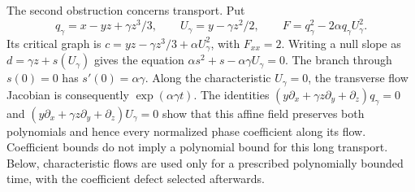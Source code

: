 \documentclass[11pt]{amsart}
\theoremstyle{definition}
\theoremstyle{remark}
\numberwithin{equation}{section}
\begin{document}
The second obstruction concerns transport. Put
\[
q_\gamma=x-yz+\gamma z^3/3,\qquad U_\gamma=y-\gamma z^2/2,\qquad F=q_\gamma^2-2\alpha q_\gamma U_\gamma^2.
\]
Its critical graph is $c=yz-\gamma z^3/3+\alpha U_\gamma^2$, with $F_{xx}=2$. Writing a null slope as $d=\gamma z+s(U_\gamma)$ gives the equation $\alpha s^2+s-\alpha\gamma U_\gamma=0$. The branch through $s(0)=0$ has $s'(0)=\alpha\gamma$. Along the characteristic $U_\gamma=0$, the transverse flow Jacobian is consequently $\exp(\alpha\gamma t)$. The identities $(y\partial_x+\gamma z\partial_y+\partial_z)q_\gamma=0$ and $(y\partial_x+\gamma z\partial_y+\partial_z)U_\gamma=0$ show that this affine field preserves both polynomials and hence every normalized phase coefficient along its flow. Coefficient bounds do not imply a polynomial bound for this long transport. Below, characteristic flows are used only for a prescribed polynomially bounded time, with the coefficient defect selected afterwards.
\end{document}
